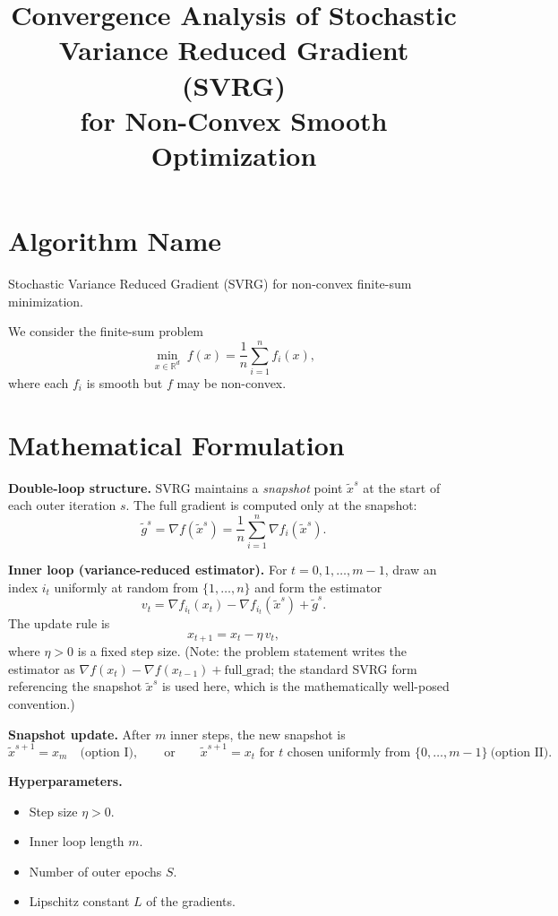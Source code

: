 \documentclass[11pt]{article}
\title{Convergence Analysis of Stochastic Variance Reduced Gradient (SVRG) \\ for Non-Convex Smooth Optimization}
\author{}
\date{}
\begin{document}
\maketitle

\section*{Algorithm Name}
Stochastic Variance Reduced Gradient (SVRG) for non-convex finite-sum minimization.

We consider the finite-sum problem
\[
\min_{x \in \mathbb{R}^d} \; f(x) = \frac{1}{n}\sum_{i=1}^{n} f_i(x),
\]
where each $f_i$ is smooth but $f$ may be non-convex.

\section*{Mathematical Formulation}

\textbf{Double-loop structure.}
SVRG maintains a \emph{snapshot} point $\tilde{x}^{s}$ at the start of each outer
iteration $s$. The full gradient is computed only at the snapshot:
\[
\tilde{g}^{s} = \nabla f(\tilde{x}^{s}) = \frac{1}{n}\sum_{i=1}^{n}\nabla f_i(\tilde{x}^{s}).
\]

\textbf{Inner loop (variance-reduced estimator).}
For $t = 0,1,\dots,m-1$, draw an index $i_t$ uniformly at random from $\{1,\dots,n\}$
and form the estimator
\[
v_t = \nabla f_{i_t}(x_t) - \nabla f_{i_t}(\tilde{x}^{s}) + \tilde{g}^{s}.
\]
The update rule is
\[
x_{t+1} = x_t - \eta\, v_t,
\]
where $\eta>0$ is a fixed step size. (Note: the problem statement writes the
estimator as $\nabla f(x_t) - \nabla f(x_{t-1}) + \text{full\_grad}$; the standard
SVRG form referencing the snapshot $\tilde{x}^{s}$ is used here, which is the
mathematically well-posed convention.)

\textbf{Snapshot update.} After $m$ inner steps, the new snapshot is
\[
\tilde{x}^{s+1} = x_m \quad\text{(option I)},
\qquad\text{or}\qquad
\tilde{x}^{s+1} = x_{t} \text{ for } t \text{ chosen uniformly from } \{0,\dots,m-1\}\ \text{(option II)}.
\]

\textbf{Hyperparameters.}
\begin{itemize}
\item Step size $\eta > 0$.
\item Inner loop length $m$.
\item Number of outer epochs $S$.
\item Lipschitz constant $L$ of the gradients.
\end{itemize}
\end{document}
